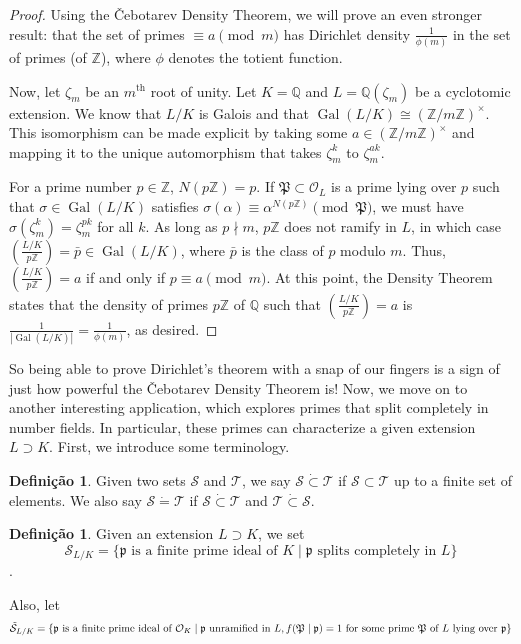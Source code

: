 \documentclass{article}
\DeclareMathOperator{\Gal}{Gal}
\newcommand{\QQ}{\mathbb{Q}}
\newcommand{\ZZ}{\mathbb{Z}}
\theoremstyle{plain}
\theoremstyle{definition}
\newtheorem{defn}[thm]{Definição}
\theoremstyle{remark}
\numberwithin{equation}{section}
\numberwithin{thm}{section}
\begin{document}
\begin{proof}
Using the Čebotarev Density Theorem, we will prove an even stronger result: that the set of primes $\equiv a \pmod{m}$ has Dirichlet density $\frac{1}{\phi(m)}$ in the set of primes (of $\ZZ$), where $\phi$ denotes the totient function.

Now, let $\zeta_{m}$ be an $m^{\text{th}}$ root of unity. Let $K = \QQ$ and $L = \QQ(\zeta_{m})$ be a cyclotomic extension. We know that $L/K$ is Galois and that $\Gal(L/K) \cong (\ZZ/m\ZZ)^{\times}$. This isomorphism can be made explicit by taking some $a \in (\ZZ/m\ZZ)^{\times}$ and mapping it to the unique automorphism that takes $\zeta_{m}^{k}$ to $\zeta_{m}^{ak}$. 

For a prime number $p \in \ZZ$, $N(p\ZZ) = p$. If $\mathfrak{P} \subset \mathcal{O}_L$ is a prime lying over $p$ such that $\sigma \in \Gal(L/K)$ satisfies $\sigma(\alpha) \equiv \alpha^{N(p\ZZ)} \pmod{\mathfrak{P}}$, we must have $\sigma(\zeta_{m}^{k}) = \zeta_{m}^{pk}$ for all $k$. As long as $p \nmid m$, $p\ZZ$ does not ramify in $L$, in which case $\left(\frac{L/K}{p\ZZ}\right) = \bar{p} \in \Gal(L/K)$, where $\bar{p}$ is the class of $p$ modulo $m$. Thus, $\left(\frac{L/K}{p\ZZ}\right) = a$ if and only if $p \equiv a \pmod{m}$. At this point, the Density Theorem states that the density of primes $p\ZZ$ of $\QQ$ such that $\left(\frac{L/K}{p\ZZ}\right) = a$ is $\frac{1}{|\Gal(L/K)|} = \frac{1}{\phi(m)}$, as desired. 
\end{proof}

So being able to prove Dirichlet's theorem with a snap of our fingers is a sign of just how powerful the Čebotarev Density Theorem is! Now, we move on to another interesting application, which explores primes that split completely in number fields. In particular, these primes can characterize a given extension $L \supset K$. First, we introduce some terminology.

\begin{defn}
Given two sets $\mathcal{S}$ and $\mathcal{T}$, we say $\mathcal{S} \dot{\subset} \mathcal{T}$ if $\mathcal{S} \subset \mathcal{T}$ up to a finite set of elements. We also say $\mathcal{S} \dot{=} \mathcal{T}$ if $\mathcal{S} \dot{\subset} \mathcal{T}$ and $\mathcal{T} \dot{\subset} \mathcal{S}$. 
\end{defn}

\begin{defn}
Given an extension $L \supset K$, we set $$\mathcal{S}_{L/K} = \{\mathfrak{p} \text{ is a finite prime ideal of } K \mid \mathfrak{p} \text{ splits completely in } L\}$$.  

Also, let $$\Tilde{\mathcal{S}}_{L/K} = \{\mathfrak{p} \text{ is a finite prime ideal of } \mathcal{O}_K \mid \mathfrak{p} \text{ unramified in } L, f(\mathfrak{P} \mid \mathfrak{p}) = 1 \text{ for some prime } \mathfrak{P} \text{ of } L \text{ lying over } \mathfrak{p}\}$$
\end{defn}
\end{document}
